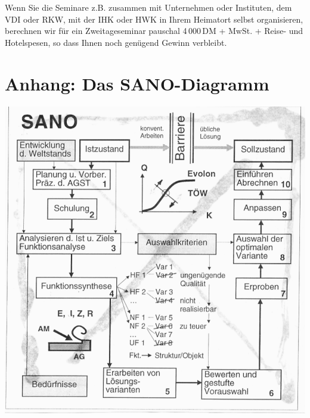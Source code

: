 \documentclass[11pt,a4paper]{article}
\begin{document}
Wenn Sie die Seminare z.B. zusammen mit Unternehmen oder Instituten, dem VDI
oder RKW, mit der IHK oder HWK in Ihrem Heimatort selbst organisieren,
berechnen wir für ein Zweitageseminar pauschal 4\,000\,DM + MwSt. + Reise-
und Hotelspesen, so dass  Ihnen noch genügend Gewinn verbleibt.

\section*{Anhang: Das SANO-Diagramm}

\begin{center}  
  \includegraphics[width=.9\textwidth]{Herrlich-SANO.pdf}
\end{center}


\end{document}
